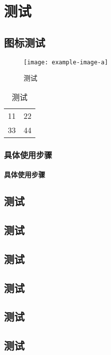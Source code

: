 \documentclass[library = {math.master}, type = for-library]{whuthesis}
\begin{document}
\mainmatter

\chapter{测试}
\section{图标测试}

\begin{figure}[htbp]
  \centering
  \texttt{[image: example-image-a]}
  \caption{测试}
  \label{figure:test}
\end{figure}

\begin{table}[htbp]
  \centering
  \caption{测试}
  \label{table:test}
  \begin{tabular}{|c|c|}
    11 & 22 \\
    33 & 44 
  \end{tabular}
\end{table}


\subsection{具体使用步骤}
\subsubsection{具体使用步骤}
\section{测试}
\section{测试}
\section{测试}
\section{测试}
\section{测试}
\section{测试}
\end{document}
